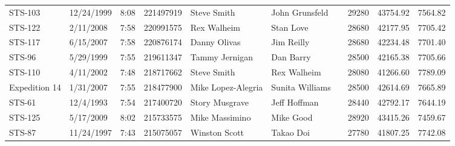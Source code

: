 \documentclass[sigconf]{acmart}
\begin{document}
\begin{table}[]
\begin{tabular}{llllllllll}
		STS-103          & 12/24/1999    & 8:08              & 221497919                              & Steve Smith        & John Grunsfeld       &                 & 29280                                 & 43754.92                   & 7564.82                   \\
		STS-122          & 2/11/2008     & 7:58              & 220991575                              & Rex Walheim        & Stan Love            &                 & 28680                                 & 42177.95                   & 7705.42                   \\
		STS-117          & 6/15/2007     & 7:58              & 220876174                              & Danny Olivas       & Jim Reilly           &                 & 28680                                 & 42234.48                   & 7701.40                   \\
		STS-96           & 5/29/1999     & 7:55              & 219611347                              & Tammy Jernigan     & Dan Barry            &                 & 28500                                 & 42165.38                   & 7705.66                   \\
		STS-110          & 4/11/2002     & 7:48              & 218717662                              & Steve Smith        & Rex Walheim          &                 & 28080                                 & 41266.60                   & 7789.09                   \\
		Expedition 14    & 1/31/2007     & 7:55              & 218477900                              & Mike Lopez-Alegria & Sunita Williams      &                 & 28500                                 & 42614.69                   & 7665.89                   \\
		STS-61           & 12/4/1993     & 7:54              & 217400720                              & Story Musgrave     & Jeff Hoffman         &                 & 28440                                 & 42792.17                   & 7644.19                   \\
		STS-125          & 5/17/2009     & 8:02              & 215733575                              & Mike Massimino     & Mike Good            &                 & 28920                                 & 43415.26                   & 7459.67                   \\
		STS-87           & 11/24/1997    & 7:43              & 215075057                              & Winston Scott      & Takao Doi            &                 & 27780                                 & 41807.25                   & 7742.08                   \\

\end{tabular}
\end{table}
\end{document}
